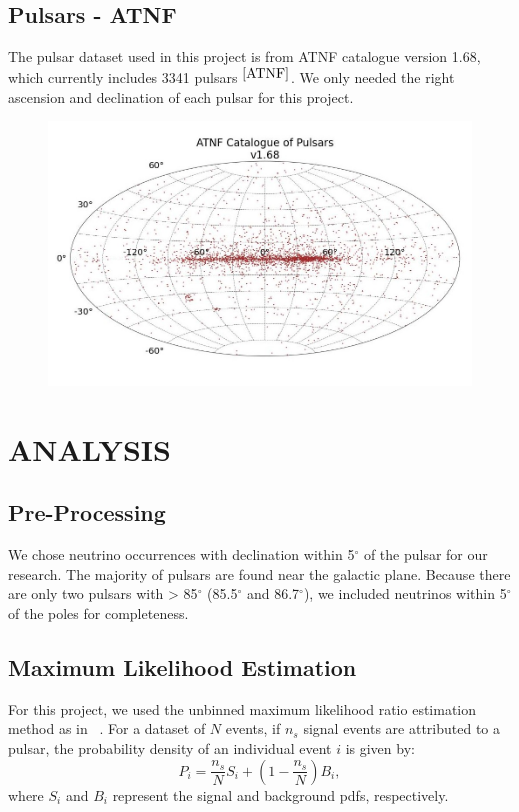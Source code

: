 \documentclass{article}
\begin{document}
\subsection{\large Pulsars - ATNF}
The pulsar dataset used in this project is from ATNF catalogue version 1.68, which currently includes 3341 pulsars$^{~\cite{ATNF}}$. We only needed the right ascension and declination of each pulsar for this project.
\begin{figure}[!ht]
	\begin{center}
		\includegraphics[width=0.6\columnwidth]{Images/pulsar-map.jpg}
	\end{center}
	\label{fig:psrsky}	
\end{figure}
\newpage
\section{\Large ANALYSIS}
\subsection{\large Pre-Processing}
We chose neutrino occurrences with declination within 5$^\circ$ of the pulsar for our research. The majority of pulsars are found near the galactic plane.
Because there are only two pulsars with > 85$^\circ$ (85.5$^\circ$ and 86.7$^\circ$), we included neutrinos within 5$^\circ$ of the poles for completeness.

\subsection{\large Maximum Likelihood Estimation}
For this project, we used the unbinned maximum likelihood ratio estimation method as in ~\cite{Hooper,Kamionkowski,LuoZhang,Li22}.
For a dataset of $N$ events, if $n_s$ signal events are attributed to a pulsar, the probability
density of an individual event $i$ is given by:
\begin{equation}
	P_i = \frac{n_s}{N} S_i + (1-\frac{n_s}{N}) B_i,
	\label{eq:prob}
\end{equation}
where $S_i$ and $B_i$ represent the signal and background pdfs, respectively.\\
\end{document}

